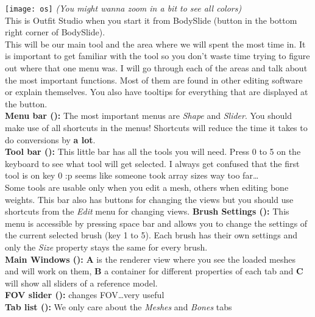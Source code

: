 \texttt{[image: os]}
\textit{(You might wanna zoom in a bit to see all colors)}\\
This is Outfit Studio when you start it from BodySlide (button in the bottom right corner of BodySlide).\\
This will be our main tool and the area where we will spent the most time in. It is important to get familiar  
with the tool so you don't waste time trying to figure out where that one menu was.
I will go through each of the areas and talk about the most important functions. Most of them are found in 
other editing software or explain themselves. You also have tooltips for everything that are displayed at the button.\\
\textbf{Menu bar ({\color{blue}{blue}}):} The most important menus are \textit{Shape} and \textit{Slider}. You should make use 
of all shortcuts in the menus! Shortcuts will reduce the time it takes to do conversions by \textbf{a lot}.\\
\textbf{Tool bar ({\color{green}{green}}):} This little bar has all the tools you will need. Press 0 to 5 on the keyboard 
to see what tool will get selected. I always get confused that the first tool is on key 0 :p seems like someone took array 
sizes way too far\dots\\
Some tools are usable only when you edit a mesh, others when editing bone weights. This bar also has buttons for changing the views 
but you should use shortcuts from the \textit{Edit} menu for changing views.
\textbf{Brush Settings ({\color{black}{black}}):} 
This menu is accessible by pressing space bar and allows you to change the settings of the current selected brush (key 1 to 5). 
Each brush has their own settings and only the \textit{Size} property stays the same for every brush.\\
\textbf{Main Windows ({\color{red}{red}}):} \textbf{A} is the renderer view where you see the loaded meshes and will work on them,
\textbf{B} a container for different properties of each tab and \textbf{C} will show all sliders of a reference model.\\
\textbf{FOV slider ({\color{lila}{purple}}):} changes FOV\dots very useful\\
\textbf{Tab list ({\color{yellow}{yellow}}):} We only care about the \textit{Meshes} and \textit{Bones} tabs